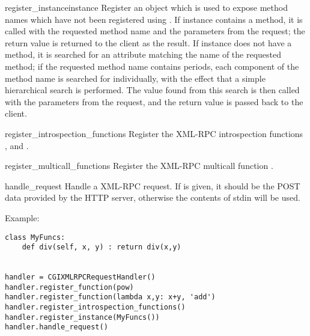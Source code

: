 \begin{methoddesc}{register_instance}{instance}
Register an object which is used to expose method names 
which have not been registered using . If 
instance contains a  method, it is called with the 
requested method name and the parameters from the 
request; the return value is returned to the client as the result.
If instance does not have a  method, it is searched 
for an attribute matching the name of the requested method; if 
the requested method name contains periods, each 
component of the method name is searched for individually, 
with the effect that a simple hierarchical search is performed. 
The value found from this search is then called with the 
parameters from the request, and the return value is passed 
back to the client. 
\end{methoddesc}

\begin{methoddesc}{register_introspection_functions}{}
Register the XML-RPC introspection functions 
,  and 
.
\end{methoddesc}

\begin{methoddesc}{register_multicall_functions}{}
Register the XML-RPC multicall function .
\end{methoddesc}

\begin{methoddesc}{handle_request}{}
Handle a XML-RPC request. If  is given, it 
should be the POST data provided by the HTTP server, 
otherwise the contents of stdin will be used.
\end{methoddesc}

Example:

\begin{verbatim}
class MyFuncs:
    def div(self, x, y) : return div(x,y)


handler = CGIXMLRPCRequestHandler()
handler.register_function(pow)
handler.register_function(lambda x,y: x+y, 'add')
handler.register_introspection_functions()
handler.register_instance(MyFuncs())
handler.handle_request()
\end{verbatim}
